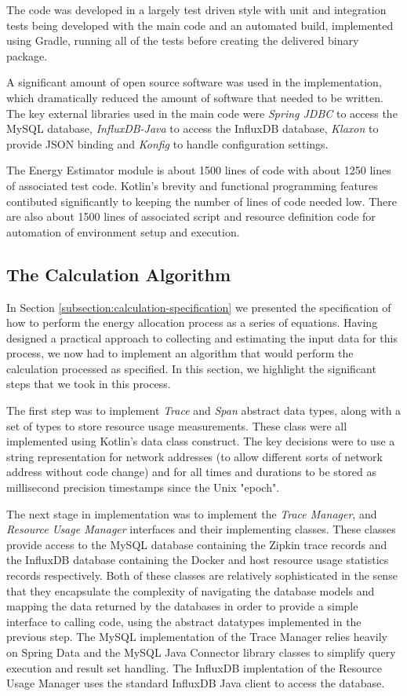 The code was developed in a largely test driven style with unit and integration tests being developed with the main code and an automated build, implemented using Gradle, running all of the tests before creating the delivered binary package.

A significant amount of open source software was used in the implementation, which dramatically reduced the amount of software that needed to be written.  The key external libraries used in the main code were \emph{Spring JDBC} to access the MySQL database, \emph{InfluxDB-Java} to access the InfluxDB database, \emph{Klaxon} to provide JSON binding and \emph{Konfig} to handle configuration settings. 

The Energy Estimator module is about 1500 lines of code with about 1250 lines of associated test code.  Kotlin's brevity and functional programming features contibuted significantly to keeping the number of lines of code needed low.  There are also about 1500 lines of associated script and resource definition code for automation of environment setup and execution.

\subsection{The Calculation Algorithm}
\label{subsection:algorithm}

In Section \ref{subsection:calculation-specification} we presented the specification of how to perform the energy allocation process as a series of equations.  Having designed a practical approach to collecting and estimating the input data for this process, we now had to implement an algorithm that would perform the calculation processed as specified.  In this section, we highlight the significant steps that we took in this process.

The first step was to implement \emph{Trace} and \emph{Span} abstract data types, along with a set of types to store resource usage measurements.  These class were all implemented using Kotlin's data class construct.  The key decisions were to use a string representation for network addresses (to allow different sorts of network address without code change) and for all times and durations to be stored as millisecond precision timestamps since the Unix "epoch".

The next stage in implementation was to implement the \emph{Trace Manager}, and \emph{Resource Usage Manager} interfaces and their implementing classes.  These classes provide access to the MySQL database containing the Zipkin trace records and the InfluxDB database containing the Docker and host resource usage statistics records respectively.  Both of these classes are relatively sophisticated in the sense that they encapsulate the complexity of navigating the database models and mapping the data returned by the databases in order to provide a simple interface to calling code, using the abstract datatypes implemented in the previous step.  The MySQL implementation of the Trace Manager relies heavily on Spring Data and the MySQL Java Connector library classes to simplify query execution and result set handling.  The InfluxDB implentation of the Resource Usage Manager uses the standard InfluxDB Java client to access the database.

